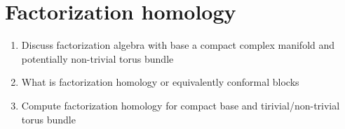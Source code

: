\documentclass[12pt]{amsart}
\theoremstyle{definition}
\theoremstyle{remark}
\def\brian{\textcolor{blue}{BW: }\textcolor{blue}}
\begin{document}
\section{Factorization homology}

{\color{red}
\begin{enumerate}
\item Discuss factorization algebra with base a compact complex manifold and potentially non-trivial torus bundle
\item What is factorization homology or equivalently conformal blocks
\item Compute factorization homology for compact base and tirivial/non-trivial torus bundle
\end{enumerate}
}


%  




\address{\tiny DEPARTMENT OF MATHEMATICS AND STATISTICS, BOSTON UNIVERSITY, 111 CUMMINGTON MALL, BOSTON} \\
\indent \footnotesize{}

\address{\tiny DEPARTMENT OF MATHEMATICS, NORTH\brian{WESTERN/EASTERN},...}
\indent \footnotesize{}
\end{document}
